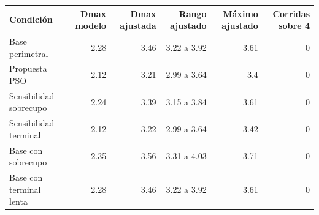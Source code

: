 \begin{tabular}{lrrrrr}
\toprule
Condición & Dmax modelo & Dmax ajustada & Rango ajustado & Máximo ajustado & Corridas sobre 4 \\
\midrule
Base perimetral & 2.28 & 3.46 & 3.22 a 3.92 & 3.61 & 0 \\
Propuesta PSO & 2.12 & 3.21 & 2.99 a 3.64 & 3.4 & 0 \\
Sensibilidad sobrecupo & 2.24 & 3.39 & 3.15 a 3.84 & 3.61 & 0 \\
Sensibilidad terminal & 2.12 & 3.22 & 2.99 a 3.64 & 3.42 & 0 \\
Base con sobrecupo & 2.35 & 3.56 & 3.31 a 4.03 & 3.71 & 0 \\
Base con terminal lenta & 2.28 & 3.46 & 3.22 a 3.92 & 3.61 & 0 \\
\bottomrule
\end{tabular}
